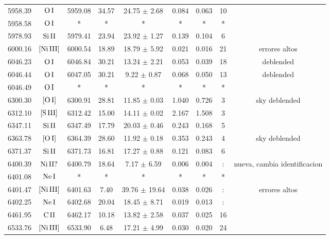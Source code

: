 \documentclass{article}
\begin{document}
\begin{table*}
\begin{adjustbox}{width=\textwidth}
\begin{tabular}{ccccccccc}
5958.39 & $\mbox{O}\thinspace \mbox{I}$ & 5959.08 & 34.57 & 24.75 $\pm$ 2.68 & 0.084 & 0.063 & 10 &  \\
5958.58 & $\mbox{O}\thinspace \mbox{I}$ & * & * & * & * & * & * &  \\
5978.93 & $\mbox{Si}\thinspace \mbox{II}$ & 5979.41 & 23.94 & 23.92 $\pm$ 1.27 & 0.139 & 0.104 & 6 &  \\
6000.16 & $\mbox{[Ni}\thinspace \mbox{III]}$ & 6000.54 & 18.89 & 18.79 $\pm$ 5.92 & 0.021 & 0.016 & 21 &  errores altos \\
6046.23 & $\mbox{O}\thinspace \mbox{I}$ & 6046.84 & 30.21 & 13.24 $\pm$ 2.21 & 0.053 & 0.039 & 18 &  deblended \\
6046.44 & $\mbox{O}\thinspace \mbox{I}$ & 6047.05 & 30.21 & 9.22 $\pm$ 0.87 & 0.068 & 0.050 & 13 &  deblended \\
6046.49 & $\mbox{O}\thinspace \mbox{I}$ & * & * & * & * & * & * &  \\
6300.30 & $\mbox{[O}\thinspace \mbox{I]}$ & 6300.91 & 28.81 & 11.85 $\pm$ 0.03 & 1.040 & 0.726 & 3 &  sky deblended \\
6312.10 & $\mbox{[S}\thinspace \mbox{III]}$ & 6312.42 & 15.00 & 14.11 $\pm$ 0.02 & 2.167 & 1.508 & 3 &  \\
6347.11 & $\mbox{Si}\thinspace \mbox{II}$ & 6347.49 & 17.79 & 20.03 $\pm$ 0.46 & 0.243 & 0.168 & 5 &  \\
6363.78 & $\mbox{[O}\thinspace \mbox{I]}$ & 6364.39 & 28.60 & 11.92 $\pm$ 0.18 & 0.353 & 0.243 & 4 &  sky deblended \\
6371.37 & $\mbox{Si}\thinspace \mbox{II}$ & 6371.73 & 16.81 & 17.27 $\pm$ 0.88 & 0.121 & 0.083 & 6 &  \\
6400.39 & $\mbox{Ni}\thinspace \mbox{II?}$ & 6400.79 & 18.64 & 7.17 $\pm$ 6.59 & 0.006 & 0.004 & : &  nueva, cambia identificacion \\
6401.08 & $\mbox{Ne}\thinspace \mbox{I}$ & * & * & * & * & * & * &  \\
6401.47 & $\mbox{[Ni}\thinspace \mbox{III]}$ & 6401.63 & 7.40 & 39.76 $\pm$ 19.64 & 0.038 & 0.026 & : &  errores altos \\
6402.25 & $\mbox{Ne}\thinspace \mbox{I}$ & 6402.68 & 20.04 & 18.45 $\pm$ 8.71 & 0.019 & 0.013 & : &  \\
6461.95 & $\mbox{C}\thinspace \mbox{II}$ & 6462.17 & 10.18 & 13.82 $\pm$ 2.58 & 0.037 & 0.025 & 16 &  \\
6533.76 & $\mbox{[Ni}\thinspace \mbox{III]}$ & 6533.90 & 6.48 & 17.21 $\pm$ 4.99 & 0.030 & 0.020 & 24 &  \\

\end{tabular}
\end{adjustbox}
\end{table*}
\end{document}
